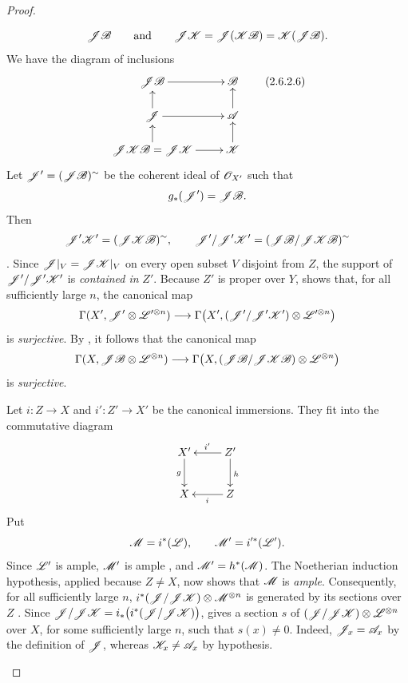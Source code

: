 \begin{proof}
\begin{env}[2.6.2.5]
\[
  \mathscr{J}\mathscr{B}
  \qquad\text{and}\qquad
  \mathscr{J}\mathscr{K}
  =
  \mathscr{J}(\mathscr{K}\mathscr{B})
  =
  \mathscr{K}(\mathscr{J}\mathscr{B}).
\]
We have the diagram of inclusions
\[
  \xymatrix@R=1.5em{
    \sh{J}\sh{B}\ar[r] &
    \sh{B}\\
    \sh{J}\ar[r]\ar[u] &
    \sh{A}\ar[u]\\
    \sh{J}\sh{K}\sh{B}=\sh{J}\sh{K}
      \ar[r]\ar[u] &
    \sh{K}\ar[u]
  }
  \label{III.2.6.2.6}\tag{2.6.2.6}
\]
Let $\mathscr{J}'=(\mathscr{J}\mathscr{B})^\sim$ be the coherent ideal of
$\mathscr{O}_{X'}$ such that
\[
  g_*(\mathscr{J}')=\mathscr{J}\mathscr{B}.
\]
Then
\[
  \mathscr{J}'\mathscr{K}'=(\mathscr{J}\mathscr{K}\mathscr{B})^\sim,
  \qquad
  \mathscr{J}'/\mathscr{J}'\mathscr{K}'
  =
  (\mathscr{J}\mathscr{B}/\mathscr{J}\mathscr{K}\mathscr{B})^\sim
\]
.
Since $\mathscr{J}|_V=\mathscr{J}\mathscr{K}|_V$ on every open subset $V$ disjoint
from $Z$, the support of $\mathscr{J}'/\mathscr{J}'\mathscr{K}'$ is \emph{contained in}
$Z'$.
Because $Z'$ is proper over $Y$,  shows that, for all
sufficiently large $n$, the canonical map
\[
  \Gamma(X',\mathscr{J}'\otimes\mathscr{L}'^{\otimes n})
  \longrightarrow
  \Gamma\bigl(
    X',
    (\mathscr{J}'/\mathscr{J}'\mathscr{K}')\otimes\mathscr{L}'^{\otimes n}
  \bigr)
\]
is \emph{surjective}.
By , it follows that the canonical map
\[
  \Gamma(X,\mathscr{J}\mathscr{B}\otimes\mathscr{L}^{\otimes n})
  \longrightarrow
  \Gamma\bigl(
    X,
    (\mathscr{J}\mathscr{B}/\mathscr{J}\mathscr{K}\mathscr{B})
      \otimes\mathscr{L}^{\otimes n}
  \bigr)
\]
is \emph{surjective}.

Let $i:Z\to X$ and $i':Z'\to X'$ be the canonical immersions.
They fit into the commutative diagram
\[
  \xymatrix{
    X'\ar[d]_g &
    Z'\ar[l]_{i'}\ar[d]^h\\
    X &
    Z\ar[l]^{i}
  }
\]
Put
\[
  \mathscr{M}=i^*(\mathscr{L}),
  \qquad
  \mathscr{M}'=i'^*(\mathscr{L}').
\]
Since $\mathscr{L}'$ is ample, $\mathscr{M}'$ is ample
, and $\mathscr{M}'=h^*(\mathscr{M})$.
The Noetherian induction hypothesis, applied because $Z\neq X$, now
shows that $\mathscr{M}$ is \emph{ample}.
Consequently, for all sufficiently large $n$, $i^*(\mathscr{J}/\mathscr{J}\mathscr{K})\otimes\mathscr{M}^{\otimes n}$
is generated by its sections over $Z$ .
Since $\mathscr{J}/\mathscr{J}\mathscr{K}
=
i_*\bigl(i^*(\mathscr{J}/\mathscr{J}\mathscr{K})\bigr)$,
 gives a section $s$ of $(\mathscr{J}/\mathscr{J}\mathscr{K})\otimes\mathscr{L}^{\otimes n}$
over $X$, for some sufficiently large $n$, such that $s(x)\neq0$.
Indeed, $\mathscr{J}_x=\mathscr{A}_x$ by the definition of $\mathscr{J}$, whereas
$\mathscr{K}_x\neq\mathscr{A}_x$ by hypothesis.


\end{env}
\end{proof}
